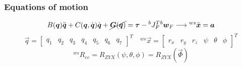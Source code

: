 \begin{frame}[shrink=15]
  \frametitle{Equations of motion}
  \begin{block}{}
    \begin{equation*}
      B(\vec{q}) \ddot{\vec{q}} + C(\vec{q}, \dot{\vec{q}}) \dot{\vec{q}} + \cancel{\vec{G}(\vec{q})} = \vec{\tau} - {}^{b}J^{T}_{F} {}^b\vec{w}_{F} 
      \longrightarrow {}^{ws}\ddot{\vec{x}} = \vec{a}
    \end{equation*}
    \begin{equation*}
      \vec{q} = 
      \begin{bmatrix}
        q_1 & q_2 & q_3 & q_4 & q_5 & q_6 & q_7
      \end{bmatrix}^T
      \quad
          {}^{ws}\vec{x} = 
          \begin{bmatrix}
            r_x & r_y & r_z & \psi & \theta & \phi
          \end{bmatrix}^T
    \end{equation*}
    \begin{equation*}
      {}^{ws}R_{ee} = R_{ZYX}(\psi, \theta, \phi) = R_{ZYX}(\vec{\Phi})
    \end{equation*}
  \end{block}


\end{frame}
